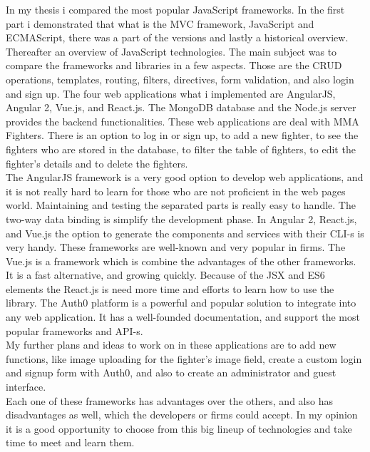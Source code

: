 
In my thesis i compared the most popular JavaScript frameworks. In the first part i demonstrated that what is the MVC framework, JavaScript and ECMAScript, there was a part of the versions and lastly a historical overview. Thereafter an overview of JavaScript technologies.
The main subject was to compare the frameworks and libraries in a few aspects. Those are the CRUD operations, templates, routing, filters, directives, form validation, and also login and sign up.
The four web applications what i implemented are AngularJS, Angular 2, Vue.js, and React.js. The MongoDB database and the Node.js server provides the backend functionalities. These web applications are deal with MMA Fighters. There is an option to log in or sign up, to add a new fighter, to see the fighters who are stored in the database, to filter the table of fighters, to edit the fighter's details and to delete the fighters.\\ The AngularJS framework is a very good option to develop web applications, and it is not really hard to learn for those who are not proficient in the web pages world. Maintaining and testing the separated parts is really easy to handle. The two-way data binding is simplify the development phase. In Angular 2, React.js, and Vue.js the option to generate the components and services with their CLI-s is very handy. These frameworks are well-known and very popular in firms. The Vue.js is a framework which is combine the advantages of the other frameworks. It is a fast alternative, and growing quickly. 
Because of the JSX and ES6 elements the React.js is need more time and efforts to learn how to use the library.
The Auth0 platform is a powerful and popular solution to integrate into any web application. It has a well-founded documentation, and support the most popular frameworks and API-s.\\
My further plans and ideas to work on in these applications are to add new functions, like image uploading for the fighter's image field, create a custom login and signup form with Auth0, and also to create an administrator and guest interface.\\
Each one of these frameworks has advantages over the others, and also has disadvantages as well, which the developers or firms could accept.
In my opinion it is a good opportunity to choose from this big lineup of technologies and take time to meet and learn them. 




